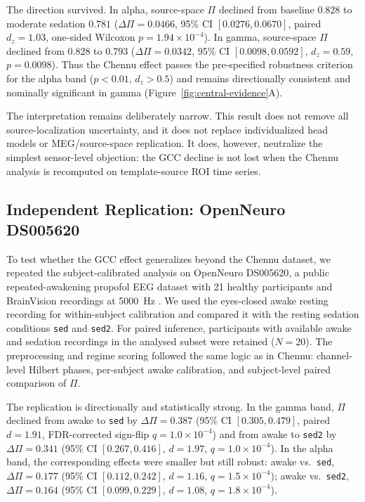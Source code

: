 \documentclass[11pt,a4paper]{article}
\theoremstyle{plain}
\theoremstyle{definition}
\theoremstyle{remark}
\begin{document}
The direction survived. In alpha, source-space $\Pi$ declined from baseline $0.828$ to moderate sedation $0.781$ ($\Delta\Pi=0.0466$, 95\% CI $[0.0276,0.0670]$, paired $d_z=1.03$, one-sided Wilcoxon $p=1.94\times10^{-4}$). In gamma, source-space $\Pi$ declined from $0.828$ to $0.793$ ($\Delta\Pi=0.0342$, 95\% CI $[0.0098,0.0592]$, $d_z=0.59$, $p=0.0098$). Thus the Chennu effect passes the pre-specified robustness criterion for the alpha band ($p<0.01$, $d_z>0.5$) and remains directionally consistent and nominally significant in gamma (Figure~\ref{fig:central-evidence}A).

The interpretation remains deliberately narrow. This result does not remove all source-localization uncertainty, and it does not replace individualized head models or MEG/source-space replication. It does, however, neutralize the simplest sensor-level objection: the GCC decline is not lost when the Chennu analysis is recomputed on template-source ROI time series.

\subsection{Independent Replication: OpenNeuro DS005620}
\label{sec:ds005620}

To test whether the GCC effect generalizes beyond the Chennu dataset, we repeated the subject-calibrated analysis on OpenNeuro DS005620, a public repeated-awakening propofol EEG dataset with 21 healthy participants and BrainVision recordings at 5000~Hz \citep{bajwa2024ds005620}. We used the eyes-closed awake resting recording for within-subject calibration and compared it with the resting sedation conditions \texttt{sed} and \texttt{sed2}. For paired inference, participants with available awake and sedation recordings in the analysed subset were retained ($N=20$). The preprocessing and regime scoring followed the same logic as in Chennu: channel-level Hilbert phases, per-subject awake calibration, and subject-level paired comparison of $\Pi$.

The replication is directionally and statistically strong. In the gamma band, $\Pi$ declined from awake to \texttt{sed} by $\Delta\Pi = 0.387$ (95\% CI $[0.305,0.479]$, paired $d=1.91$, FDR-corrected sign-flip $q=1.0\times10^{-4}$) and from awake to \texttt{sed2} by $\Delta\Pi = 0.341$ (95\% CI $[0.267,0.416]$, $d=1.97$, $q=1.0\times10^{-4}$). In the alpha band, the corresponding effects were smaller but still robust: awake vs.\ \texttt{sed}, $\Delta\Pi = 0.177$ (95\% CI $[0.112,0.242]$, $d=1.16$, $q=1.5\times10^{-4}$); awake vs.\ \texttt{sed2}, $\Delta\Pi = 0.164$ (95\% CI $[0.099,0.229]$, $d=1.08$, $q=1.8\times10^{-4}$).
\end{document}
